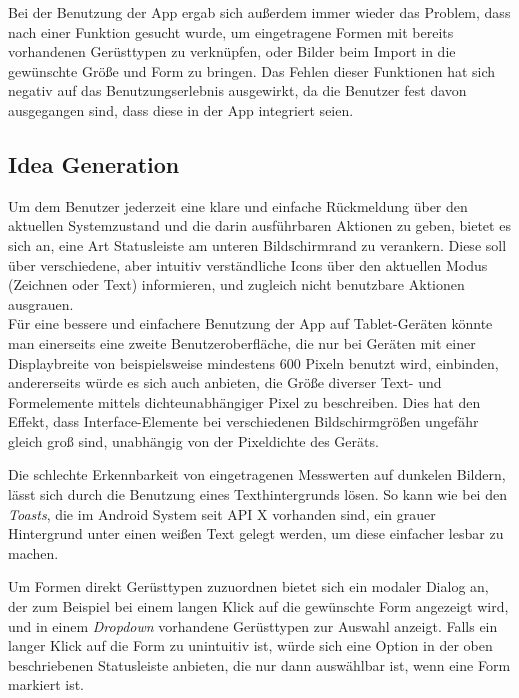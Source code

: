 Bei der Benutzung der App ergab sich außerdem immer wieder das Problem, dass nach einer Funktion gesucht wurde, um eingetragene Formen mit bereits vorhandenen Gerüsttypen zu verknüpfen, oder Bilder beim Import in die gewünschte Größe und Form zu bringen.
Das Fehlen dieser Funktionen hat sich negativ auf das Benutzungserlebnis ausgewirkt, da die Benutzer fest davon ausgegangen sind, dass diese in der App integriert seien.

\subsection{Idea Generation}\label{subsec:idea2}
Um dem Benutzer jederzeit eine klare und einfache Rückmeldung über den aktuellen Systemzustand und die darin ausführbaren Aktionen zu geben, bietet es sich an, eine Art  Statusleiste am unteren Bildschirmrand zu verankern.
Diese soll über verschiedene, aber intuitiv verständliche Icons über den aktuellen Modus (Zeichnen oder Text) informieren, und zugleich nicht benutzbare Aktionen ausgrauen. \\

Für eine bessere und einfachere Benutzung der App auf Tablet-Geräten könnte man einerseits eine zweite Benutzeroberfläche, die nur bei Geräten mit einer Displaybreite von beispielsweise mindestens $600$ Pixeln benutzt wird, einbinden, andererseits würde es sich auch anbieten, die Größe diverser Text- und Formelemente mittels dichteunabhängiger Pixel zu beschreiben.
Dies hat den Effekt, dass Interface-Elemente bei verschiedenen Bildschirmgrößen ungefähr gleich groß sind, unabhängig von der Pixeldichte des Geräts.  

Die schlechte Erkennbarkeit von eingetragenen Messwerten auf dunkelen Bildern, lässt sich durch die Benutzung eines Texthintergrunds lösen.
So kann wie bei den \emph{Toasts}, die im Android System seit API X vorhanden sind, ein grauer Hintergrund unter einen weißen Text gelegt werden, um diese einfacher lesbar zu machen. 

Um Formen direkt Gerüsttypen zuzuordnen bietet sich ein modaler Dialog an, der zum Beispiel bei einem langen Klick auf die gewünschte Form angezeigt wird, und in einem \emph{Dropdown} vorhandene Gerüsttypen zur Auswahl anzeigt.
Falls ein langer Klick auf die Form zu unintuitiv ist, würde sich eine Option in der oben beschriebenen Statusleiste anbieten, die nur dann auswählbar ist, wenn eine Form markiert ist. \\

